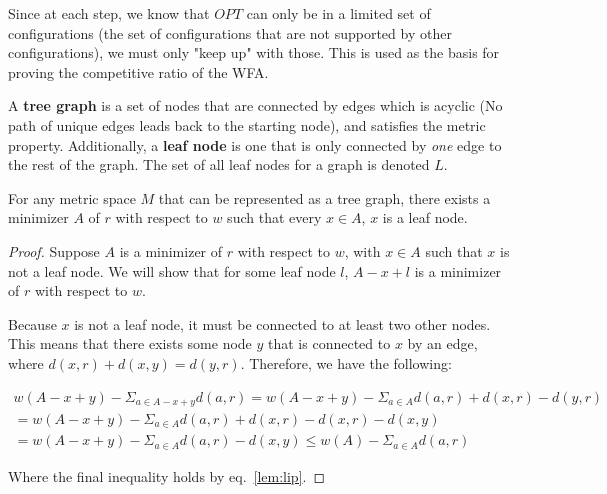 Since at each step, we know that $OPT$ can only be in a limited set of configurations (the set of configurations that are not supported by other configurations), we must only "keep up" with those. This is used as the basis for proving the competitive ratio of the WFA.

\begin{definition}
    A \textbf{tree graph} is a set of nodes that are connected by edges which is acyclic (No path of unique edges leads back to the starting node), and satisfies the metric property. Additionally, a \textbf{leaf node} is one that is only connected by \textit{one} edge to the rest of the graph. The set of all leaf nodes for a graph is denoted $L$.
\end{definition}

\begin{lemma}
    \label{lem:leaf}
    For any metric space $M$ that can be represented as a tree graph, there exists a minimizer $A$ of $r$ with respect to $w$ such that every $x \in A$, $x$ is a leaf node.
\end{lemma}

\begin{proof}
    Suppose $A$ is a minimizer of $r$ with respect to $w$, with $x \in A$ such that $x$ is not a leaf node. We will show that for some leaf node $l$, $A-x+l$ is a minimizer of $r$ with respect to $w$. 

    Because $x$ is not a leaf node, it must be connected to at least two other nodes. This means that there exists some node $y$ that is connected to $x$ by an edge, where $d(x,r) + d(x,y) = d(y,r)$. Therefore, we have the following:

    \begin{equation*}
        \begin{gathered}
            w(A-x+y) - \Sigma_{a \in A-x+y} d(a,r) = w(A-x+y) - \Sigma_{a \in A} d(a,r) + d(x,r) - d(y,r) \\
            = w(A-x+y) - \Sigma_{a \in A} d(a,r) + d(x,r) - d(x,r) - d(x,y)\\
            = w(A-x+y) - \Sigma_{a \in A} d(a,r) - d(x,y) \leq w(A) - \Sigma_{a \in A} d(a,r)
        \end{gathered}
    \end{equation*}

    Where the final inequality holds by eq.~\ref{lem:lip}.
\end{proof}



